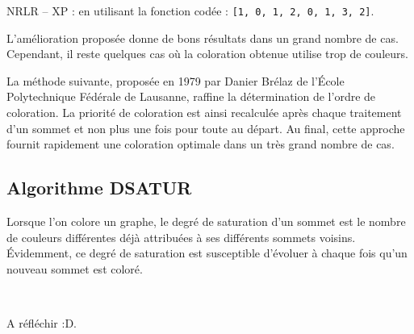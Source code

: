 \ifprof
\begin{corrige}
NRLR -- XP : en utilisant la fonction codée : \lstinline{[1, 0, 1, 2, 0, 1, 3, 2]}.
\end{corrige}
\else
\fi

\ifprof\else
L'amélioration proposée donne de bons résultats dans un grand nombre de cas. Cependant, il reste quelques cas où la coloration obtenue utilise trop de couleurs.

La méthode suivante, proposée en 1979 par Danier Brélaz de l'École Polytechnique Fédérale de Lausanne, raffine la détermination de l'ordre de coloration. La priorité de coloration est ainsi recalculée après chaque traitement d'un sommet et non plus une fois pour toute au départ. Au final, cette approche fournit rapidement une coloration optimale dans un très grand nombre de cas.
\fi

\subsection{Algorithme DSATUR}
\ifprof\else
Lorsque l’on colore un graphe, le degré de saturation d’un sommet est le nombre de couleurs différentes déjà attribuées à ses différents sommets voisins. Évidemment, ce degré de saturation est susceptible d’évoluer à chaque fois qu’un nouveau sommet est coloré.
\fi

\ifprof
\begin{corrige}~\\ \vspace{-.5cm}

\end{corrige}
\else
\fi



\ifprof
\begin{corrige}
A réfléchir :D.
\end{corrige}
\else
\fi


